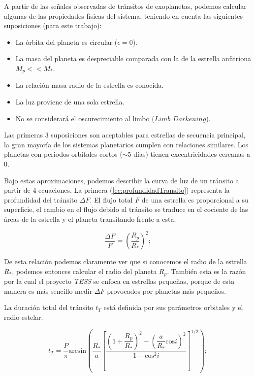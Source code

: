 A partir de las señales observadas de tránsitos de exoplanetas, podemos calcular algunas de las propiedades físicas del sistema, teniendo en cuenta las siguientes suposiciones (para este trabajo):

\begin{itemize}
\item La órbita del planeta es circular ($\epsilon = 0$).
\item La masa del planeta es despreciable comparada con la de la estrella anfitriona \\ $M_{p} << M_{*}$.
\item La relación masa-radio de la estrella es conocida.
\item La luz proviene de una sola estrella.
\item No se considerará el oscurecimiento al limbo ($\textit{Limb Darkening}$).
\end{itemize}

Las primeras 3 suposiciones son aceptables para estrellas de secuencia principal, la gran mayoría de los sistemas planetarios cumplen con relaciones similares. Los planetas con periodos orbitales cortos ($\sim 5$ días) tienen excentricidades cercanas a 0.

Bajo estas aproximaciones, podemos describir la curva de luz de un tránsito a partir de 4 ecuaciones. La primera (\ref{ec:profundidadTransito}) representa la profundidad del tránsito $\Delta F$. El flujo total $F$ de una estrella es proporcional a su superficie, el cambio en el flujo debido al tránsito se traduce en el cociente de las áreas de la estrella y el planeta transitando frente a esta.

\begin{equation}
	\label{ec:profundidadTransito}
  \displaystyle \dfrac{\Delta F}{F}=\left(\dfrac{R_p}{R_*} \right)^{2} ;
\end{equation}

De esta relación podemos claramente ver que si conocemos el radio de la estrella $R_{*}$, podemos entonces calcular el radio del planeta $R_{p}$. También esta es la razón por la cual el proyecto \textit{TESS} se enfoca en estrellas pequeñas, porque de esta manera es más sencillo medir $\Delta F$ provocados por planetas más pequeños.

La duración total del tránsito $t_{T}$ está definida por sus parámetros orbitales y el radio estelar.

\begin{equation}
\label{ec:tiempoTransito}
\displaystyle t_{T}=\dfrac{P}{\pi} \mbox{arcsin} \left(\dfrac{R_{*}}{a}\left[ \dfrac{\left( 1+\dfrac{R_{p}}{R_{*}}\right)^{2}-\left( \dfrac{a}{R_{*}} \mbox{cos} i\right)^{2}}{1-\mbox{cos}^{2}i} \right]^{1/2}  \right); 
\end{equation}

